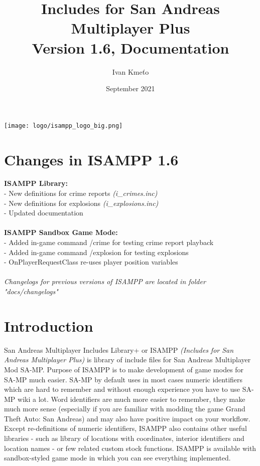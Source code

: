 \documentclass{article}
\title{Includes for San Andreas Multiplayer Plus\\Version 1.6, Documentation}
\author{Ivan Kmeťo}
\date{September 2021}
\begin{document}
\maketitle
\begin{center}
\texttt{[image: logo/isampp\_logo\_big.png]}
\end{center}

\newpage
\tableofcontents

\newpage
\section{Changes in ISAMPP 1.6}
\textbf{ISAMPP Library:}
\\- New definitions for crime reports \textit{(i\_crimes.inc)}
\\- New definitions for explosions \textit{(i\_explosions.inc)}
\\- Updated documentation
\\
\\
\textbf{ISAMPP Sandbox Game Mode:}
\\- Added in-game command /crime for testing crime report playback
\\- Added in-game command /explosion for testing explosions
\\- OnPlayerRequestClass re-uses player position variables
\\
\\\textit{Changelogs for previous versions of ISAMPP are located in folder "docs/changelogs"}

\newpage
\section{Introduction}
San Andreas Multiplayer Includes Library+ or ISAMPP \textit{(Includes for San Andreas Multiplayer Plus)} is library of include files for San Andreas Multiplayer Mod SA-MP. Purpose of ISAMPP is to make development of game modes for SA-MP much easier. SA-MP by default uses in most cases numeric identifiers which are hard to remember and without enough experience you have to use SA-MP wiki a lot. Word identifiers are much more easier to remember, they make much more sense (especially if you are familiar with modding the game Grand Theft Auto: San Andreas) and may also have positive impact on your workflow. Except re-definitions of numeric identifiers, ISAMPP also contains other useful libraries - such as library of locations with coordinates, interior identifiers and location names - or few related custom stock functions. ISAMPP is available with sandbox-styled game mode in which you can see everything implemented.
\end{document}
